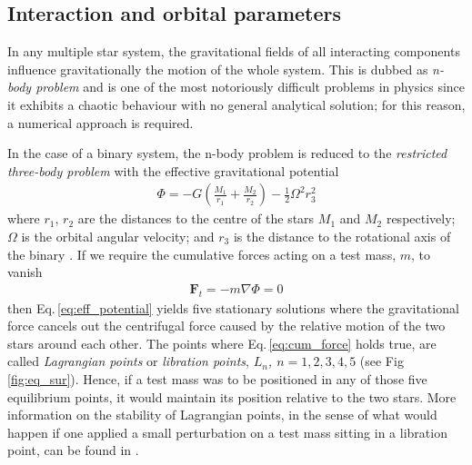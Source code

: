 \documentclass[../../main/thesis_msc.tex]{subfiles}
\begin{document}
			\subsection{Interaction and orbital parameters}
			
				In any multiple star system, the gravitational fields of all interacting components influence gravitationally the motion of the whole system. This is dubbed as \emph{n-body problem} and is one of the most notoriously difficult problems in physics since it exhibits a chaotic behaviour with no general analytical solution; for this reason, a numerical approach is required.

				In the case of a binary system, the n-body problem is reduced to the \emph{restricted three-body problem} with the effective gravitational potential 
					\begin{eqnarray}
						\label{eq:eff_potential}
						\Phi = -G \left( \frac{M_1}{r_1} + \frac{M_2}{r_2} \right) - \frac{1}{2} \Omega^2 r_3^2
					\end{eqnarray}
					where $r_1$, $r_2$ are the distances to the centre of the stars $M_1$ and $M_2$ respectively; $\Omega$ is the orbital angular velocity; and $r_3$ is the distance to the rotational axis of the binary \citep[p.~639]{Tauris_2006}. If we require the cumulative forces acting on a test mass, $m$, to vanish
					\begin{eqnarray}
						\label{eq:cum_force}
						\pmb{F}_t = -m \nabla \Phi = 0
					\end{eqnarray}
				then Eq.\,\ref{eq:eff_potential} yields five stationary solutions where the gravitational force cancels out the centrifugal force caused by the relative motion of the two stars around each other. The points where Eq.\,\ref{eq:cum_force} holds true, are called \emph{Lagrangian points} or \emph{libration points}, \emph{$L_n$, $n=1,2,3,4,5$} (see Fig \ref{fig:eq_sur}). Hence, if a test mass was to be positioned in any of those five equilibrium points, it would maintain its position relative to the two stars. More information on the stability of Lagrangian points, in the sense of what would happen if one applied a small perturbation on a test mass sitting in a libration point, can be found in \cite{Szebehely, Celletti1990, Schwarz2012}.
				
\end{document}
